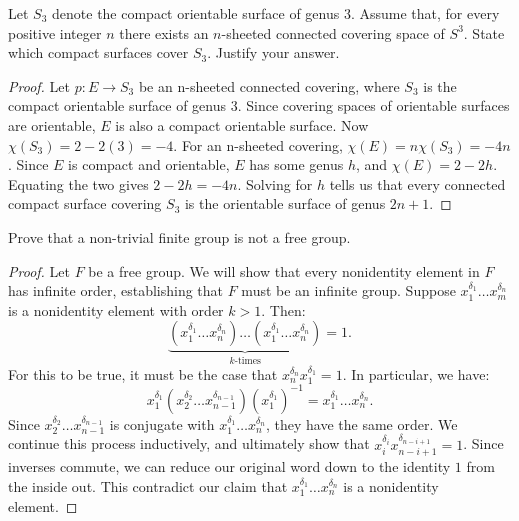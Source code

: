 \documentclass[10pt,oneside,openany]{memoir}
\begin{document}
\begin{exercise}
	Let $S_3$ denote the compact orientable surface of genus 3. Assume that, for every positive integer $n$ there exists an $n$-sheeted connected covering space of $S^3$. State which compact surfaces cover $S_3$. Justify your answer.
\end{exercise}
	\begin{proof}
		Let $p:E \rightarrow S_3$ be an n-sheeted connected covering, where $S_3$ is the compact orientable surface of genus 3. Since covering spaces of orientable surfaces are orientable, $E$ is also a compact orientable surface. Now $\chi(S_3) = 2 - 2(3) = -4$. For an n-sheeted covering, $\chi(E) = n \chi(S_3) = -4n$. Since $E$ is compact and orientable, $E$ has some genus $h$, and $\chi(E) = 2 - 2h$. Equating the two gives $2-2h = -4n$. Solving for $h$ tells us that every connected compact surface covering $S_3$ is the orientable surface of genus $2n+1$.	
	\end{proof}

\begin{exercise}
	Prove that a non-trivial finite group is not a free group.
\end{exercise}
	\begin{proof}
		Let $F$ be a free group. We will show that every nonidentity element in $F$ has infinite order, establishing that $F$ must be an infinite group. Suppose $x_1^{\delta_1}\ldots x_m^{\delta_n}$ is a nonidentity element with order $k > 1$. Then:
		\[
			\underbrace{(x_1^{\delta_1}\ldots x_n^{\delta_n})\ldots(x_1^{\delta_1}\ldots x_n^{\delta_n})}_{k\text{-times}} = 1.
		\] 
		For this to be true, it must be the case that $x_n^{\delta_n}x_1^{\delta_1} = 1$. In particular, we have:
		\[
			x_1^{\delta_1}(x_2^{\delta_2}\ldots x_{n-1}^{\delta_{n-1}})(x_1^{\delta_1})^{-1} = x_1^{\delta_1}\ldots x_n^{\delta_n}.
		\] 
		Since $x_2^{\delta_2}\ldots x_{n-1}^{\delta_{n-1}}$ is conjugate with $x_1^{\delta_1}\ldots x_n^{\delta_n}$, they have the same order. We continue this process inductively, and ultimately show that $x_i^{\delta_i}x_{n-i+1}^{\delta_{n-i+1}} = 1$. Since inverses commute, we can reduce our original word down to the identity $1$ from the inside out. This contradict our claim that $x_1^{\delta_{1}}\ldots x_n^{\delta_n}$ is a nonidentity element.

		
	\end{proof}
\end{document}
